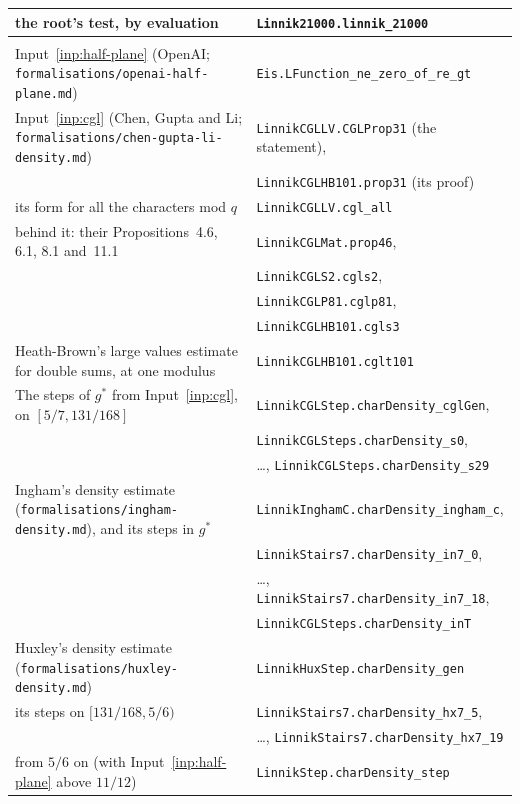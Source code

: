 \documentclass[11pt]{article}
\theoremstyle{definition}
\newcommand{\lean}[1]{\texttt{#1}}
\newcommand{\file}[1]{\nolinkurl{#1}}
\begin{document}
{\begin{longtable}{@{}>{\raggedright\arraybackslash}p{}l@{}}
\quad the root's test, by evaluation & \lean{Linnik21000.linnik\_21000} \\
\midrule
\multicolumn{2}{@{}l}{\emph{Results from the literature}} \\
Input~\ref{inp:half-plane} (OpenAI; \file{formalisations/openai-half-plane.md}) &
\lean{Eis.LFunction\_ne\_zero\_of\_re\_gt} \\
Input~\ref{inp:cgl} (Chen, Gupta and Li; \file{formalisations/chen-gupta-li-density.md}) &
\lean{LinnikCGLLV.CGLProp31} (the statement), \\
 & \lean{LinnikCGLHB101.prop31} (its proof) \\
\quad its form for all the characters mod $q$ & \lean{LinnikCGLLV.cgl\_all} \\
\quad behind it: their Propositions~4.6, 6.1, 8.1 and~11.1 & \lean{LinnikCGLMat.prop46}, \\
 & \lean{LinnikCGLS2.cgls2}, \\
 & \lean{LinnikCGLP81.cglp81}, \\
 & \lean{LinnikCGLHB101.cgls3} \\
\quad Heath-Brown's large values estimate for double sums, at one modulus \cite{hb79b, kerr, jutila} &
\lean{LinnikCGLHB101.cglt101} \\
The steps of $g^*$ from Input~\ref{inp:cgl}, on $[5/7, 131/168]$ & \lean{LinnikCGLStep.charDensity\_cglGen}, \\
 & \lean{LinnikCGLSteps.charDensity\_s0}, \\
 & \dots, \lean{LinnikCGLSteps.charDensity\_s29} \\
Ingham's density estimate (\file{formalisations/ingham-density.md}), and its steps in $g^*$ &
\lean{LinnikInghamC.charDensity\_ingham\_c}, \\
 & \lean{LinnikStairs7.charDensity\_in7\_0}, \\
 & \dots, \lean{LinnikStairs7.charDensity\_in7\_18}, \\
 & \lean{LinnikCGLSteps.charDensity\_inT} \\
Huxley's density estimate (\file{formalisations/huxley-density.md}) & \lean{LinnikHuxStep.charDensity\_gen} \\
\quad its steps on $[131/168, 5/6)$ & \lean{LinnikStairs7.charDensity\_hx7\_5}, \\
 & \dots, \lean{LinnikStairs7.charDensity\_hx7\_19} \\
\quad from $5/6$ on (with Input~\ref{inp:half-plane} above $11/12$) & \lean{LinnikStep.charDensity\_step} \\

\end{longtable}}
\end{document}
